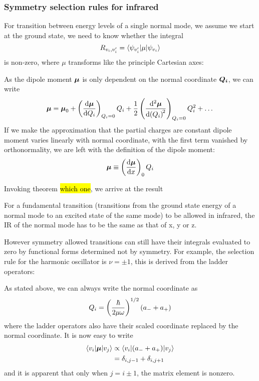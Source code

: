 \subsubsection{Symmetry selection rules for infrared}
For transition between energy levels of a single normal mode, we assume we start at the ground state, we need to know whether the integral
\begin{equation}
R_{v_i,v_i'}=\langle\psi_{v_i'}|\mu|\psi_{v_i} \rangle
\end{equation}
is non-zero, where $\mu$ transforms like the principle Cartesian axes:
\begin{defi}
As the dipole moment $\boldsymbol{\mu}$ is only dependent on the normal coordinate $\boldsymbol{Q_i}$, we can write
\begin{equation}
\bvec{\mu}=\bvec{\mu}_0+\lf(\diff{\bvec{\mu}}{Q_i}\rt)_{Q_i=0} Q_i+\frac{1}{2}\lf(\diff[2]{\bvec{\mu}}{Q_i} \rt)_{Q_i=0}Q_i^2+\dots
\end{equation}
If we make the approximation that the partial charges are constant \ie dipole moment varies linearly with normal coordinate, with the first term vanished by orthonormality, we are left with the definition of the dipole moment:
\begin{equation}
\bvec{\mu}\equiv \lf(\diff{\bvec{\mu}}{x}\rt)_0 Q_i
\end{equation}
\end{defi}
Invoking theorem \hl{which one}, we arrive at the result
\begin{thrm}
\label{irsymm}
For a fundamental transition (transitions from the ground state energy of a normal mode to an excited state of the same mode) to be allowed in infrared, the IR of the normal mode has to be the same as that of x, y or z.
\end{thrm}
However symmetry allowed transitions can still have their integrals evaluated to zero by functional forms determined not by symmetry. For example, the selection rule for the harmonic oscillator is $\nu=\pm 1$, this is derived from the ladder operators:\par
As stated above, we can always write the normal coordinate as 
\begin{equation}
Q_i=\left(\frac{\hbar}{2\mu\omega} \right)^{1/2}(a_-+a_+)
\end{equation}
where the ladder operators also have their scaled coordinate replaced by the normal coordinate. It is now easy to write
\begin{equation}
\label{harmsele}
\begin{aligned}
\langle v_i|\boldsymbol{\mu}|v_j\rangle&\propto \langle v_i|(a_-+a_+)|v_j \rangle\\
&=\delta_{i,j-1}+\delta_{i,j+1}
\end{aligned}
\end{equation}
and it is apparent that only when $j=i\pm 1$, the matrix element is nonzero. 
